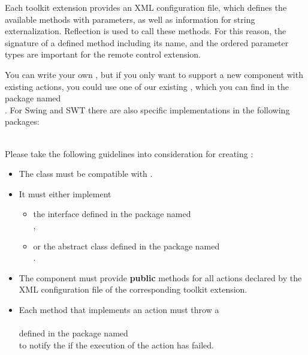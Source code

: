Each \ite{}  toolkit extension provides an XML configuration file, which defines the
available methods with parameters, as well as information for string
externalization. Reflection is used to call these methods. For this reason, the
signature of a defined method including its name, and the ordered parameter
types are important for the remote control extension.

You can write your own \gdtesterclasses, but if you only want to support a new
component with existing actions, you could use one of our existing
\gdtesterclasses, which you can find in the package named\\
. For Swing and SWT there are also
specific implementations in the following packages:\\
\\

Please take the following guidelines into consideration for creating
\gdtesterclasses:
\begin{itemize}
  \item The class must be compatible with .
  \item It must either implement
  \begin{itemize}
    \item the interface  defined in the package named\\
        ,\\
	 \item or the abstract class 
	     defined in the package named\\
	     .
  \end{itemize}
  \item The component must provide \textbf{public} methods for all actions
        declared by the XML configuration file of the corresponding \ite{}
        toolkit extension.
  \item Each method that implements an action must throw a\\
        \\
        defined in the package named\\
        to notify the \ite{} if the execution of the action has  failed.
\end{itemize}

